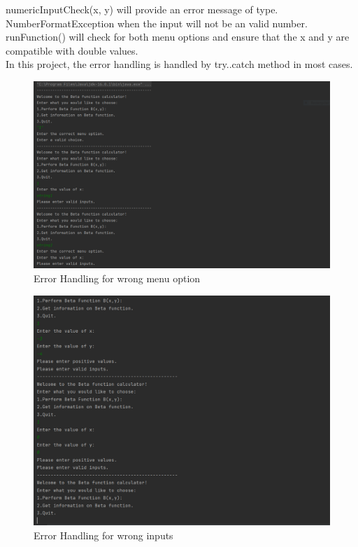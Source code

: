 \documentclass[letterpaper, 11pt]{article}
\begin{document}
    numericInputCheck(x, y)  will provide an error message of type.\\ NumberFormatException when the input will not be an valid number. \\
    runFunction() will check for both menu options and ensure that the x and y are compatible with double values.
    \newline \\
    In this project, the error handling is handled by try..catch method in most cases. 
        \begin{figure}[htb]
        \begin{center}
            \includegraphics[width=18cm]{images/error1.PNG}
        \end{center}
        \caption{Error Handling for wrong menu option}
        \label{fig:error1}
    \end{figure}
    
    \begin{figure}[htb]
        \begin{center}
            \includegraphics[width=18cm]{images/error2.PNG}
        \end{center}
        \caption{Error Handling for wrong inputs}
        \label{fig:error2}
    \end{figure}
\end{document}
